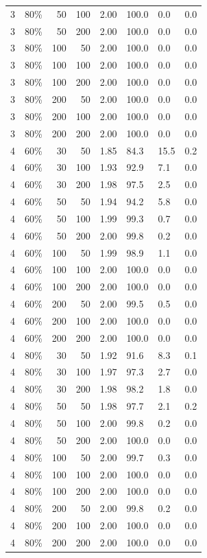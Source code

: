\begin{table}[ht]
\begin{tabular}{rlrrllll}
  3 & 80\% & 50 & 100 & 2.00 & 100.0 & 0.0 & 0.0 \\ 
  3 & 80\% & 50 & 200 & 2.00 & 100.0 & 0.0 & 0.0 \\ 
  3 & 80\% & 100 & 50 & 2.00 & 100.0 & 0.0 & 0.0 \\ 
  3 & 80\% & 100 & 100 & 2.00 & 100.0 & 0.0 & 0.0 \\ 
  3 & 80\% & 100 & 200 & 2.00 & 100.0 & 0.0 & 0.0 \\ 
  3 & 80\% & 200 & 50 & 2.00 & 100.0 & 0.0 & 0.0 \\ 
  3 & 80\% & 200 & 100 & 2.00 & 100.0 & 0.0 & 0.0 \\ 
  3 & 80\% & 200 & 200 & 2.00 & 100.0 & 0.0 & 0.0 \\ 
  4 & 60\% & 30 & 50 & 1.85 & 84.3 & 15.5 & 0.2 \\ 
  4 & 60\% & 30 & 100 & 1.93 & 92.9 & 7.1 & 0.0 \\ 
  4 & 60\% & 30 & 200 & 1.98 & 97.5 & 2.5 & 0.0 \\ 
  4 & 60\% & 50 & 50 & 1.94 & 94.2 & 5.8 & 0.0 \\ 
  4 & 60\% & 50 & 100 & 1.99 & 99.3 & 0.7 & 0.0 \\ 
  4 & 60\% & 50 & 200 & 2.00 & 99.8 & 0.2 & 0.0 \\ 
  4 & 60\% & 100 & 50 & 1.99 & 98.9 & 1.1 & 0.0 \\ 
  4 & 60\% & 100 & 100 & 2.00 & 100.0 & 0.0 & 0.0 \\ 
  4 & 60\% & 100 & 200 & 2.00 & 100.0 & 0.0 & 0.0 \\ 
  4 & 60\% & 200 & 50 & 2.00 & 99.5 & 0.5 & 0.0 \\ 
  4 & 60\% & 200 & 100 & 2.00 & 100.0 & 0.0 & 0.0 \\ 
  4 & 60\% & 200 & 200 & 2.00 & 100.0 & 0.0 & 0.0 \\ 
  4 & 80\% & 30 & 50 & 1.92 & 91.6 & 8.3 & 0.1 \\ 
  4 & 80\% & 30 & 100 & 1.97 & 97.3 & 2.7 & 0.0 \\ 
  4 & 80\% & 30 & 200 & 1.98 & 98.2 & 1.8 & 0.0 \\ 
  4 & 80\% & 50 & 50 & 1.98 & 97.7 & 2.1 & 0.2 \\ 
  4 & 80\% & 50 & 100 & 2.00 & 99.8 & 0.2 & 0.0 \\ 
  4 & 80\% & 50 & 200 & 2.00 & 100.0 & 0.0 & 0.0 \\ 
  4 & 80\% & 100 & 50 & 2.00 & 99.7 & 0.3 & 0.0 \\ 
  4 & 80\% & 100 & 100 & 2.00 & 100.0 & 0.0 & 0.0 \\ 
  4 & 80\% & 100 & 200 & 2.00 & 100.0 & 0.0 & 0.0 \\ 
  4 & 80\% & 200 & 50 & 2.00 & 99.8 & 0.2 & 0.0 \\ 
  4 & 80\% & 200 & 100 & 2.00 & 100.0 & 0.0 & 0.0 \\ 
  4 & 80\% & 200 & 200 & 2.00 & 100.0 & 0.0 & 0.0 \\ 
   \hline
\end{tabular}
\end{table}
